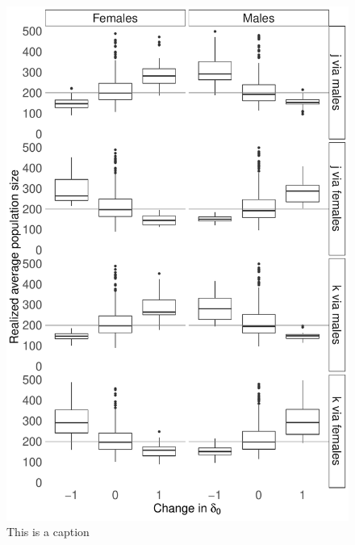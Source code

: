 \documentclass[12pt]{article}
\begin{document}
\begin{figure}[H]
  \centerline{\includegraphics[height=0.8\textheight]{box_plots_d0.pdf}}
  \caption{ This is a caption }
    \label{fig:changes}
\end{figure}



\clearpage


\end{document}
